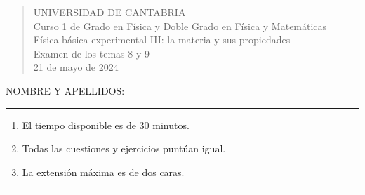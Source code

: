 \documentclass[11pt]{articulo}
\begin{document}
\begin{verse}
{\Large UNIVERSIDAD DE CANTABRIA}\\ 
\vspace*{0.5cm}
{\normalsize \rm Curso 1 de Grado en F\'isica y Doble Grado en F\'isica y Matem\'aticas}\\
{\normalsize \rm F\'isica b\'asica experimental III: la materia y sus propiedades}\\ 
{\normalsize \rm Examen de los temas 8 y 9}\\
{\normalsize \rm 21 de mayo de 2024}\\
\end{verse} 

\vspace*{0.25cm}

NOMBRE Y APELLIDOS:\\

\vspace*{0.25cm}
 
\hrule
\begin{enumerate}
\item[] El tiempo disponible es de 30 minutos.
\item[] Todas las cuestiones y ejercicios punt\'uan igual.
\item[] La extensi\'on m\'axima es de dos caras.
\end{enumerate}
\hrule
          
\end{document}
